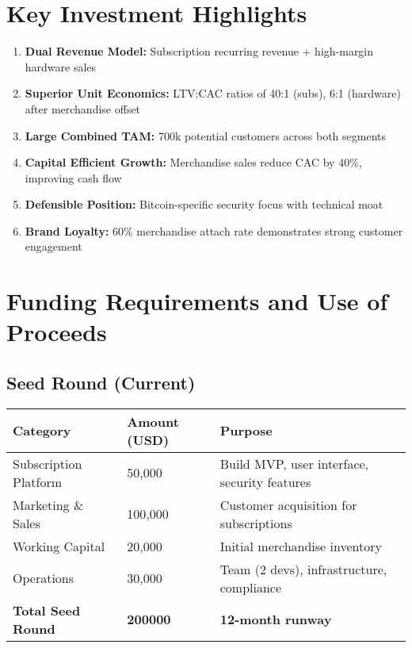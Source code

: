 \documentclass[11pt]{article}
\newcommand{\merchAttachRate}{60}
\newcommand{\ltvCacHwRatio}{6}
\newcommand{\ltvCacSubsRatio}{40}
\newcommand{\seedAmount}{200000}
\begin{document}
\section{Key Investment Highlights}

\begin{enumerate}
  \item \textbf{Dual Revenue Model:} Subscription recurring revenue + high-margin hardware sales
  \item \textbf{Superior Unit Economics:} LTV:CAC ratios of \ltvCacSubsRatio:1 (subs), \ltvCacHwRatio:1 (hardware) after merchandise offset
  \item \textbf{Large Combined TAM:} 700k potential customers across both segments
  \item \textbf{Capital Efficient Growth:} Merchandise sales reduce CAC by 40\%, improving cash flow
  \item \textbf{Defensible Position:} Bitcoin-specific security focus with technical moat
  \item \textbf{Brand Loyalty:} \merchAttachRate\% merchandise attach rate demonstrates strong customer engagement
\end{enumerate}

\section{Funding Requirements and Use of Proceeds}

\subsection{Seed Round (Current)}
\begin{table}[H]
\centering
\begin{tabularx}{\linewidth}{l Y Y}
\toprule
Category & Amount (USD) & Purpose \\\midrule
Subscription Platform & 50,000 & Build MVP, user interface, security features \\
Marketing \& Sales & 100,000 & Customer acquisition for subscriptions \\
Working Capital & 20,000 & Initial merchandise inventory \\
Operations & 30,000 & Team (2 devs), infrastructure, compliance \\
\textbf{Total Seed Round} & \textbf{\seedAmount} & \textbf{12-month runway} \\
\bottomrule
\end{tabularx}
\end{table}
\end{document}
